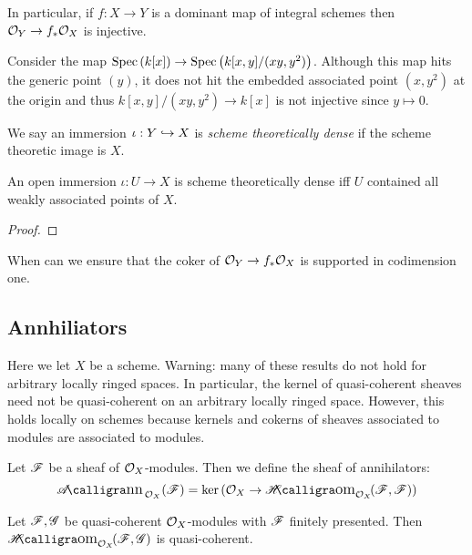 \documentclass[12pt]{article}
\begin{document}
\begin{rmk}
In particular, if $f : X \to Y$ is a dominant map of integral schemes then $\mathcal{O}_{Y} \to f_* \mathcal{O}_{X}$ is injective.
\end{rmk}

\begin{example}
Consider the map $\mathrm{Spec}\left( k[x] \right) \to \mathrm{Spec}\left( k[x,y]/(xy, y^2) \right)$. Although this map hits the generic point $(y)$, it does not hit the embedded associated point $(x, y^2)$ at the origin and thus $k[x,y]/(xy, y^2) \to k[x]$ is not injective since $y \mapsto 0$.
\end{example}

\begin{defn}
We say an immersion $\iota : Y \hookrightarrow X$ is \textit{scheme theoretically dense} if the scheme theoretic image is $X$. 
\end{defn}

\begin{lemma}
An open immersion $\iota : U \to X$ is scheme theoretically dense iff $U$ contained all weakly associated points of $X$.
\end{lemma}

\begin{proof}

\end{proof}

When can we ensure that the coker of $\mathcal{O}_{Y} \to f_* \mathcal{O}_{X}$ is supported in codimension one.

\subsection{Annhiliators}

\begin{rmk}
Here we let $X$ be a scheme. Warning: many of these results do not hold for arbitrary locally ringed spaces. In particular, the kernel of quasi-coherent sheaves need not be quasi-coherent on an arbitrary locally ringed space. However, this holds locally on schemes because kernels and cokerns of sheaves associated to modules are associated to modules.
\end{rmk}

\begin{defn}
Let $\mathscr{F}$ be a sheaf of $\mathcal{O}_{X}$-modules. Then we define the sheaf of annihilators: 
\[ \shAnn{\struct{X}}{\F} = \ker{(\struct{X} \to \shHom{\struct{X}}{\F}{\F})} \]
\end{defn}

\begin{lemma}
Let $\mathscr{F}, \mathscr{G}$ be quasi-coherent $\mathcal{O}_{X}$-modules with $\mathscr{F}$ finitely presented. Then $\shHom{\struct{X}}{\F}{\G}$ is quasi-coherent.
\end{lemma}
\end{document}
